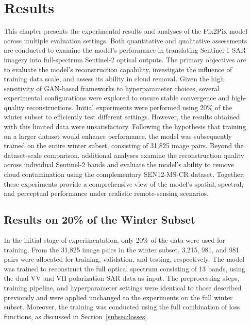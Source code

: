 \chapter{Results}
\label{chapter:results}
This chapter presents the experimental results and analyses of the Pix2Pix model across multiple evaluation settings. Both quantitative and qualitative assessments are conducted to examine the model’s performance in translating Sentinel-1 SAR imagery into full-spectrum Sentinel-2 optical outputs. The primary objectives are to evaluate the model’s reconstruction capability, investigate the influence of training data scale, and assess its ability in cloud removal.
Given the high sensitivity of GAN-based frameworks to hyperparameter choices, several experimental configurations were explored to ensure stable convergence and high-quality reconstructions. Initial experiments were performed using 20\% of the winter subset to efficiently test different settings. However, the results obtained with this limited data were unsatisfactory. Following the hypothesis that training on a larger dataset would enhance performance, the model was subsequently trained on the entire winter subset, consisting of 31,825 image pairs.
Beyond the dataset-scale comparison, additional analyses examine the reconstruction quality across individual Sentinel-2 bands and evaluate the model’s ability to remove cloud contamination using the complementary SEN12-MS-CR dataset. Together, these experiments provide a comprehensive view of the model’s spatial, spectral, and perceptual performance under realistic remote-sensing scenarios.

\section{Results on 20\% of the Winter Subset}
In the initial stage of experimentation, only 20\% of the data were used for training. From the 31,825 image pairs in the winter subset, 3,215, 981, and 981 pairs were allocated for training, validation, and testing, respectively. The model was trained to reconstruct the full optical spectrum consisting of 13 bands, using the dual VV and VH polarization SAR data as input.
The preprocessing steps, training pipeline, and hyperparameter settings were identical to those described previously and were applied unchanged to the experiments on the full winter subset. Moreover, the training was conducted using the full combination of loss functions, as discussed in Section~\ref{subsec:losses}.

